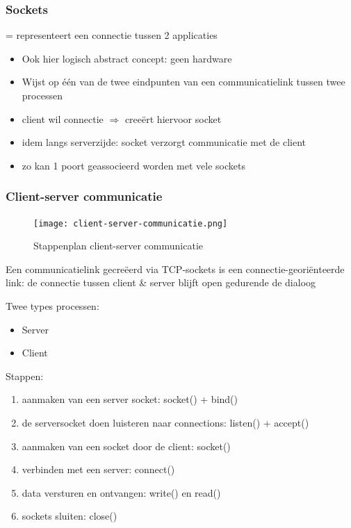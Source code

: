 \documentclass{article}
\begin{document}
\subsubsection{Sockets}

= representeert een connectie tussen 2 applicaties

\begin{itemize}
    \item Ook hier logisch abstract concept: geen hardware
    \item Wijst op één van de twee eindpunten van een communicatielink tussen twee processen
    \item client wil connectie $\Rightarrow$ creeërt hiervoor socket
    \item idem langs serverzijde: socket verzorgt communicatie met de client
    \item zo kan 1 poort geassocieerd worden met vele sockets
\end{itemize}

\subsubsection{Client-server communicatie}

\begin{figure}[H]
    \centering
    \texttt{[image: client-server-communicatie.png]}
    \caption{Stappenplan client-server communicatie}
\end{figure}

Een communicatielink gecreëerd via TCP-sockets is een connectie-georiënteerde link: 
de connectie tussen client \& server blijft open gedurende de dialoog

Twee types processen:

\begin{itemize}
    \item Server
    \item Client
\end{itemize}

Stappen:

\begin{enumerate}
    \item aanmaken van een server socket: socket() + bind()
    \item de serversocket doen luisteren naar connections: listen() + accept()
    \item aanmaken van een socket door de client: socket()
    \item verbinden met een server: connect()
    \item data versturen en ontvangen: write() en read()
    \item sockets sluiten: close()
\end{enumerate}
\end{document}
